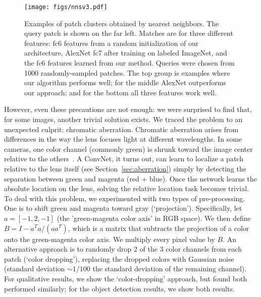 \documentclass[10pt,twocolumn,letterpaper]{article}
\begin{document}
\begin{figure*}[t]
\begin{center}

   \texttt{[image: figs/nnsv3.pdf]}
   \vspace{-.1in}
\end{center}
   \caption{Examples of patch clusters obtained by nearest neighbors.
   The query patch is shown on the far left.  Matches are for three different features: fc6 features from a random initialization of our architecture, AlexNet fc7 after training on labeled ImageNet, and the fc6 features learned from our method.  Queries were chosen from 1000 randomly-sampled patches.  The top group is examples where our algorithm performs well; for the middle AlexNet outperforms our approach; and for the bottom all three features work well.}
   \vspace{-.2in}
\label{fig:nns}
\end{figure*}

However, even these precautions are not enough:
we were surprised to find that, for some images, another trivial solution exists.  We traced the problem to an unexpected culprit: chromatic aberration.
Chromatic aberration arises from differences in the way the lens focuses light at different wavelengths.
In some cameras, one color channel (commonly green) is shrunk toward the image center relative to the others~\cite[p.~76]{brewster1854treatise}.
A ConvNet, it turns out, can learn to localize a patch relative to the lens itself (see Section~\ref{sec:aberration}) simply by detecting the separation between green and magenta (red + blue).  Once the network learns the absolute location on the lens, solving the relative location task becomes trivial.
To deal with this problem, we experimented with two types of pre-processing.  One is to shift green and magenta toward gray (`projection').  Specifically, let $a=[-1,2,-1]$ (the 'green-magenta color axis' in RGB space).  We then define $B=I-a^{T}a/(aa^{T})$, which is a matrix that subtracts the projection of a color onto the green-magenta color axis.  We multiply every pixel value by $B$.
An alternative approach is to randomly drop 2 of the 3 color channels from each patch (`color dropping'), replacing the dropped colors with Gaussian noise (standard deviation $\sim 1/100$ the standard deviation of the remaining channel). For qualitative results, we show the `color-dropping' approach, but found both performed similarly; for the object detection results, we show both results.
\end{document}
